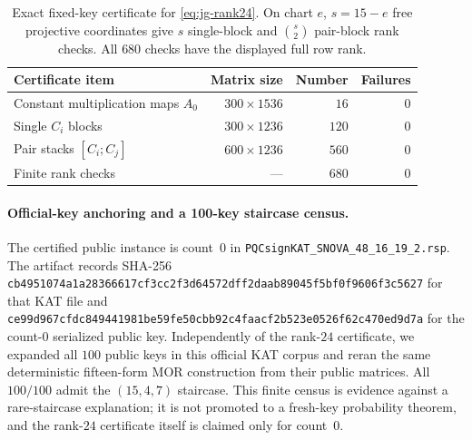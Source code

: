 \documentclass[11pt]{article}
\begin{document}
\begin{table}[t]
\centering
\caption{Exact fixed-key certificate for \eqref{eq:jg-rank24}.  On chart
$e$, $s=15-e$ free projective coordinates give $s$ single-block and
$\binom{s}{2}$ pair-block rank checks.  All $680$ checks have the displayed
full row rank.}
\label{tab:jg-rank24-certificate}
\small
\begin{tabular}{@{}l r r r@{}}
\toprule
Certificate item & Matrix size & Number & Failures\\
\midrule
Constant multiplication maps $A_0$ & $300\times1536$ & $16$ & $0$\\
Single $C_i$ blocks & $300\times1236$ & $120$ & $0$\\
Pair stacks $[C_i;C_j]$ & $600\times1236$ & $560$ & $0$\\
\midrule
Finite rank checks & --- & $680$ & $0$\\
\bottomrule
\end{tabular}
\end{table}

\paragraph{Official-key anchoring and a 100-key staircase census.}
The certified public instance is count~$0$ in
\texttt{PQCsignKAT\_SNOVA\_48\_16\_19\_2.rsp}.  The artifact records SHA-256
\texttt{cb4951074a1a28366617cf3cc2f3d64572dff2daab89045f5bf0f9606f3c5627}
for that KAT file and
\texttt{ce99d967cfdc849441981be59fe50cbb92c4faacf2b523e0526f62c470ed9d7a}
for the count-$0$ serialized public key.  Independently of the rank-$24$
certificate, we expanded all $100$ public keys in this official KAT corpus and
reran the same deterministic fifteen-form MOR construction from their public
matrices.  All $100/100$ admit the $(15,4,7)$ staircase.  This finite census
is evidence against a rare-staircase explanation; it is not promoted to a
fresh-key probability theorem, and the rank-$24$ certificate itself is
claimed only for count~$0$.
\end{document}
